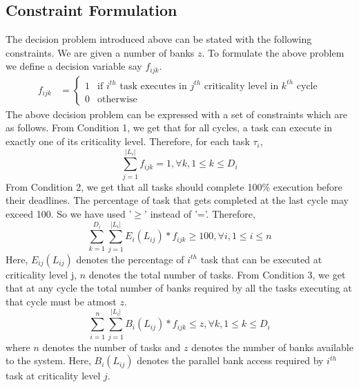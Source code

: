 \subsection{Constraint Formulation}\label{cf}
The decision problem introduced above can be stated with the following constraints.
We are given a number of banks $z$. 
To formulate the above problem we define a decision variable say $f_{ijk}$.
\newline
\begin{align*}
 f_{ijk} &=
 \begin{cases}
  1	& \text{if $i^{th}$ task executes in $j^{th}$ criticality level in $k^{th}$ cycle} \\
  0	& \text{otherwise}
 \end{cases}
\end{align*}
\newline
The above decision problem can be expressed with  a set of constraints which are as follows. From Condition 1, we get that for all cycles, a task can execute in exactly one of its criticality level. Therefore, for each task $\tau_i$,
\begin{equation} 
\sum_{j = 1}^{|L_{i}|} f_{ijk} = 1, \forall k, 1 \leq k \leq D_i
\end{equation}
\newline
From Condition 2, we get that all tasks should complete 100\% execution before their deadlines. The percentage of task that 
gets completed at the last cycle may exceed 100. So we have used '$\geq$' instead of 
'='. Therefore, 
\begin{equation}
\sum_{k = 1}^{D_{i}} \sum_{j = 1}^{|L_{i}|} E_{i}(L_{ij}) * f_{ijk} \geq 100, \forall i, 1 \leq i \leq n
\end{equation}
\newline
Here, $E_{ij}(L_{ij})$ denotes the percentage of $i^{th}$ task that can be executed at criticality level j, $n$ denotes the total 
number of tasks. 
From Condition 3, we get that at any cycle the total number of banks required by all the tasks executing at that cycle must be
atmost $z$.
\begin{equation}
\sum_{i = 1}^{n} \sum_{j = 1}^{|L_{i}|} B_{i}(L_{ij}) * f_{ijk} \leq z, \forall k, 1 \leq k \leq D_i
\end{equation}
\newline
where $n$ denotes the number of tasks and $z$ denotes the number of banks available to the system. Here, $B_{i}(L_{ij})$ 
denotes the parallel bank access required by $i^{th}$ task at criticality level $j$.
\newline
